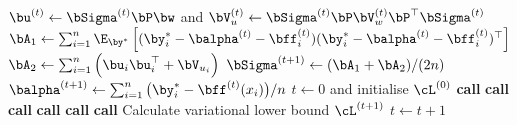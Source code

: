\begin{algorithm}[H]
\begin{algorithmic}[1]
  \State $\bu^{(t)} \gets \bSigma^{(t)}\bP\bw$ and $\bV_u^{(t)} \gets \bSigma^{(t)}\bP\bV_w^{(t)}\bP^\top\bSigma^{(t)}$
  \State $\bA_1 \gets \sum_{i=1}^n  \E_{\by^*} \left[ (\by^*_i - \balpha^{(t)} - \bff_i^{(t)})(\by^*_i - \balpha^{(t)} - \bff_i^{(t)})^\top \right]$  
  \State $\bA_2 \gets \sum_{i=1}^n \left(\bu_i\bu_i^\top + \bV_{u_i} \right)$
  \State $\bSigma^{(t+1)} \gets (\bA_1 + \bA_2)/(2n)$ 
\EndProcedure	
\Statex
{}
  \State $\balpha^{(t+1)} \gets \sum_{i=1}^n\big(\by_i^* - \bff^{(t)}(x_i)\big)/n $
\EndProcedure	
{}
  \State $t \gets 0$ and initialise $\cL^{(0)}$
    \State \textbf{call} 
    \State \textbf{call} 
    \State \textbf{call} 
    \State \textbf{call} 
    \State \textbf{call} 
    \State \textbf{call} Calculate variational lower bound $\cL^{(t+1)}$
    \State $t \gets t + 1$
  \EndWhile
\EndProcedure
\end{algorithmic}
\end{algorithm}